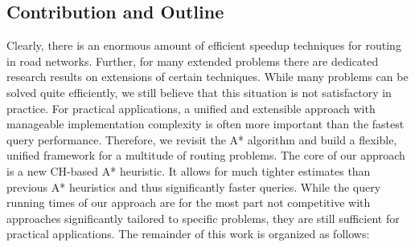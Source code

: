 \documentclass[manuscript,review]{acmart}
\begin{document}

\subsection{Contribution and Outline}

Clearly, there is an enormous amount of efficient speedup techniques for routing in road networks.
Further, for many extended problems there are dedicated research results on extensions of certain techniques.
While many problems can be solved quite efficiently, we still believe that this situation is not satisfactory in practice.
For practical applications, a unified and extensible approach with manageable implementation complexity is often more important than the fastest query performance.
Therefore, we revisit the A* algorithm and build a flexible, unified framework for a multitude of routing problems.
The core of our approach is a new CH-based A* heuristic.
It allows for much tighter estimates than previous A* heuristics and thus significantly faster queries.
While the query running times of our approach are for the most part not competitive with approaches significantly tailored to specific problems, they are still sufficient for practical applications.
The remainder of this work is organized as follows:
\end{document}
